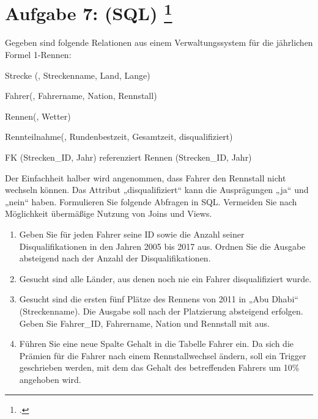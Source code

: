\documentclass{lehramt-informatik-aufgabe}
\begin{document}
\section{Aufgabe 7: (SQL)
\footcite{66116:2019:09}}

Gegeben sind folgende Relationen aus einem Verwaltungssystem für die
jährlichen Formel 1-Rennen:

\begin{liRmodell}
Strecke (, Streckenname, Land, Lange)

Fahrer(, Fahrername, Nation, Rennstall)

Rennen(, Wetter)

Rennteilnahme(, Rundenbestzeit, Gesamtzeit,
disqualifiziert)

FK (Strecken\_ID, Jahr) referenziert Rennen (Strecken\_ID, Jahr)
\end{liRmodell}

\noindent
Der Einfachheit halber wird angenommen, dass Fahrer den Rennstall nicht
wechseln können. Das Attribut „disqualifiziert“ kann die Ausprägungen
„ja“ und „nein“ haben. Formulieren Sie folgende Abfragen in SQL.
Vermeiden Sie nach Möglichkeit übermäßige Nutzung von Joins und Views.

\begin{enumerate}
\item Geben Sie für jeden Fahrer seine ID sowie die Anzahl seiner
Disqualifikationen in den Jahren 2005 bis 2017 aus. Ordnen Sie die
Ausgabe absteigend nach der Anzahl der Disqualifikationen.

\item Gesucht sind alle Länder, aus denen noch nie ein Fahrer
disqualifiziert wurde.

\item Gesucht sind die ersten fünf Plätze des Rennens von 2011 in „Abu
Dhabi“ (Streckenname). Die Ausgabe soll nach der Platzierung absteigend
erfolgen. Geben Sie Fahrer\_ID, Fahrername, Nation und Rennstall mit
aus.

\item Führen Sie eine neue Spalte Gehalt in die Tabelle Fahrer ein. Da
sich die Prämien für die Fahrer nach einem Rennstallwechsel ändern, soll
ein Trigger geschrieben werden, mit dem das Gehalt des betreffenden
Fahrers um 10\% angehoben wird.
\end{enumerate}
\end{document}
